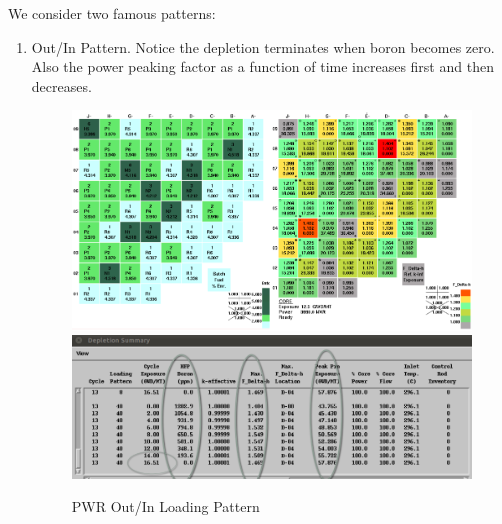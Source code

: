 \documentclass{school-22.211-notes}
\begin{document}
We consider two famous patterns: 
\begin{enumerate}
\item Out/In Pattern. Notice the depletion terminates when boron becomes zero. Also the power peaking factor as a function of time increases first and then decreases. 
\begin{figure}[ht]
  \centering
  \includegraphics[width=5in]{images/design/PWR-out-in.png}
  \includegraphics[width=5in]{images/design/PWR-out-in-2.png}
  \caption{PWR Out/In Loading Pattern} \label{PWR-out-in}
\end{figure}


\end{enumerate}
\end{document}
